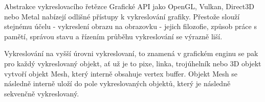 \sec Abstrakce vykreslovacího řetězce
Grafické API jako OpenGL, Vulkan, Direct3D nebo Metal nabízejí odlišné přístupy k vykreslování grafiky. Přestože slouží stejnému účelu - vykreslení obrazu na obrazovku - jejich filozofie, způsob práce s pamětí, správou stavu a řízením průběhu vykreslování se výrazně liší. 


\sec Vykreslování
na vyšší úrovni vykreslovaní, to znamená v grafickém enginu se pak pro každý vykreslovaný objekt, ať už je to pixe, linka, trojúhelník nebo 3D objekt vytvoří objekt Mesh, který interně obsahuje vertex buffer. Objekt Mesh se následně interně uloží do pole vykreslovaných objektů, který je následně sekvenčně vykreslovaný.
